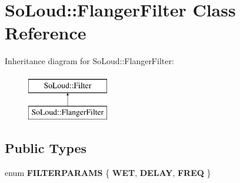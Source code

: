 \hypertarget{class_so_loud_1_1_flanger_filter}{}\section{So\+Loud\+::Flanger\+Filter Class Reference}
\label{class_so_loud_1_1_flanger_filter}
Inheritance diagram for So\+Loud\+::Flanger\+Filter\+:\begin{figure}[H]
\begin{center}
\leavevmode
\includegraphics[height=2.000000cm]{class_so_loud_1_1_flanger_filter}
\end{center}
\end{figure}
\subsection*{Public Types}
\begin{DoxyCompactItemize}
\item 
\mbox{\label{class_so_loud_1_1_flanger_filter_a0016bc09925e106d4de01686892a8eb7}} 
enum {\bfseries F\+I\+L\+T\+E\+R\+P\+A\+R\+A\+MS} \{ {\bfseries W\+ET}, 
{\bfseries D\+E\+L\+AY}, 
{\bfseries F\+R\+EQ}
 \}
\end{DoxyCompactItemize}
